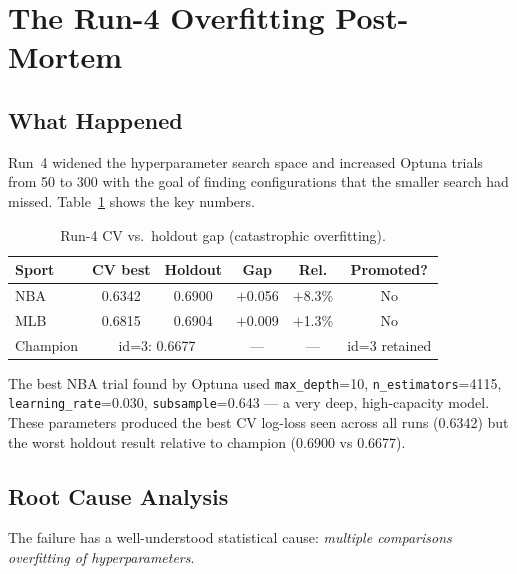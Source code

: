 \documentclass[conference]{IEEEtran}
\begin{document}
\section{The Run-4 Overfitting Post-Mortem}
\label{sec:run4}

\subsection{What Happened}

Run~4 widened the hyperparameter search space and increased Optuna
trials from 50 to 300 with the goal of finding configurations that the
smaller search had missed.  Table~\ref{tab:run4} shows the key
numbers.

\begin{table}[t]
\centering
\caption{Run-4 CV vs.\ holdout gap (catastrophic overfitting).}
\label{tab:run4}
\small
\begin{tabular}{lccccc}
\toprule
\textbf{Sport} & \textbf{CV best} & \textbf{Holdout} & \textbf{Gap} & \textbf{Rel.} & \textbf{Promoted?}\\
\midrule
NBA & 0.6342 & 0.6900 & $+$0.056 & $+$8.3\% & No \\
MLB & 0.6815 & 0.6904 & $+$0.009 & $+$1.3\% & No \\
\midrule
Champion & \multicolumn{2}{c}{id=3: 0.6677} & — & — & id=3 retained \\
\bottomrule
\end{tabular}
\end{table}

The best NBA trial found by Optuna used
\texttt{max\_depth}=10, \texttt{n\_estimators}=4115,
\texttt{learning\_rate}=0.030, \texttt{subsample}=0.643 —
a very deep, high-capacity model.  These parameters produced the
best CV log-loss seen across all runs (0.6342) but the worst holdout
result relative to champion (0.6900 vs 0.6677).

\subsection{Root Cause Analysis}
\label{subsec:run4_root}

The failure has a well-understood statistical cause: \emph{multiple
comparisons overfitting of hyperparameters}.
\end{document}
